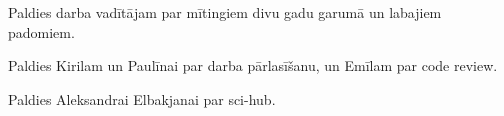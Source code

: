 Paldies darba vadītājam par mītingiem divu gadu garumā un labajiem padomiem.

Paldies Kirilam un Paulīnai par darba pārlasīšanu, un Emīlam par code review.

Paldies Aleksandrai Elbakjanai par sci-hub.